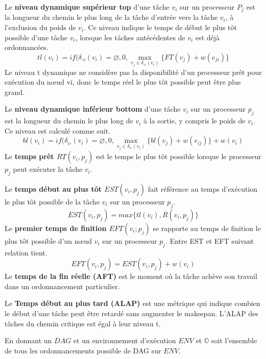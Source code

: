 Le \textbf{niveau dynamique supérieur top} d'une tâche $v_i$ sur un processeur $P_j$ est la longueur du chemin le plus long de la tâche d'entrée vers la tâche $v_i$, à l'exclusion du poids de $v_i$. 
Ce niveau indique le temps de début le plus tôt possible d'une tâche $v_i$, lorsque les tâches antécédentes de $v_i$ est déjà ordonnancées.
%
$$
tl(v_i) = if(\delta_\triangleleft(v_i) = \varnothing , 0 , \max_{ v_j \in \delta_\triangleleft(v_i)}\{ FT(v_j) + w(e_{ji}) \}
$$
%
Le niveau t dynamique ne considère pas la disponibilité d'un processeur prêt pour exécution du nœud vi, donc le temps réel le plus tôt possible peut être plus grand.

Le \textbf{niveau dynamique inférieur bottom} d'une tâche $v_i$ sur un processeur $p_j$ est la longueur du chemin le plus long de $v_i$ à la sortie, y compris le poids de $v_i$. Ce niveau est calculé comme suit.
%
$$
bl(v_i) = if(\delta_\triangleright(v_i) = \varnothing , 0 , \max_{ v_j \in \delta_\triangleright(v_i)}\{ bl(v_j) + w(e_{ij}) \} + w(v_i)
$$
%
Le \textbf{temps prêt $RT(v_i, p_j)$} est le temps le plus tôt possible lorsque le processeur $p_j$ peut exécuter la tâche $v_i$. 

Le \textbf{temps début au plus tôt $EST(v_i,p_j)$} fait référence au temps d'exécution le plus tôt possible de la tâche $v_i$ sur un processeur $p_j$. 
%
$$
EST(v_i, p_j) = max \{ tl(v_i) , R(v_i, p_j) \}
$$
%
Le \textbf{premier temps de finition $EFT (v_i; p_j)$} se rapporte au temps de finition le plus tôt possible d'un nœud $v_i$ sur un processeur $p_j$. Entre EST et EFT suivant relation tient.
%
$$
EFT(v_i, p_j) = EST(v_i , p_j) + w(v_i)
$$
%
Le \textbf{temps de la fin réelle (AFT)} est le moment où la tâche achève son travail dans un ordonnancement particulier. 

Le \textbf{Temps début au plus tard (ALAP)} est une métrique qui indique combien le début d'une tâche peut être retardé sans augmenter le makespan. L'ALAP des tâches du chemin critique est égal à leur niveau t.

En donnant un $DAG$ et un environnement d'exécution $ENV$ et $\mathbb{O}$ soit l'ensemble de tous les ordonnancements possible de DAG sur $ENV$.

